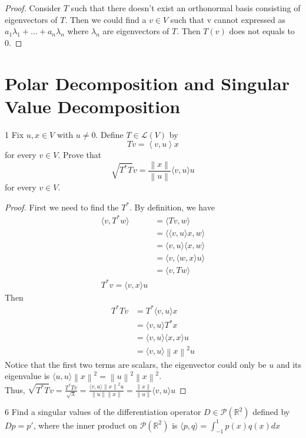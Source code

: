 \documentclass{article}
\newenvironment{problem}[1]{\begin{prob*}{#1}{}}{\end{prob*}}
\begin{document}
\begin{proof}
  Consider $T$ such that there doesn't exist an orthonormal basis consisting
  of eigenvectors of $T$. Then we could find a $v \in V$ such that v cannot expressed
  as $a_1 \lambda_1 + \dots + a_n \lambda_n$ where $\lambda_n$ are eigenvectors of $T$. Then $T(v)$ does not 
  equals to 0.
\end{proof}

\section{Polar Decomposition and Singular Value Decomposition}

\begin{problem}{1}
	Fix $u, x \in V$ with $u \neq 0$. Define $T \in \mathcal{L}(V)$ by \[
		Tv = \left< v, u \right> x
	\]
	for every $v \in V$. Prove that \[
		\sqrt{T^* T}v = \frac{\left\| x \right\|}{\left\| u \right\|} \langle v , u \rangle u
	\] for every $v \in V$.
\end{problem}
\begin{proof}
  First we need to find the $T^*$. By definition, we have
	\begin{equation*}
		\begin{aligned}
			\langle v , T^*w \rangle &= \langle Tv , w \rangle \\
			&= \langle \langle v , u \rangle x , w \rangle \\
			&= \langle v , u \rangle \langle x , w \rangle \\
			&= \langle v , \langle w , x \rangle u \rangle \\
			&= \langle v , Tw \rangle \\
			T^* v = \langle v , x \rangle u
		\end{aligned}
	\end{equation*}
	Then \begin{equation*}
		\begin{aligned}
		 T^*T v &= T^* \langle v , u \rangle x \\
		 &= \langle v , u \rangle T^* x \\
		 &= \langle v , u \rangle \langle x , x \rangle u \\
		 &= \langle v , u \rangle \left\| x \right\|^{2} u
		\end{aligned}
	\end{equation*}
	Notice that the first two terms are scalars,
	the eigenvector could only be $u$ and its eigenvalue
	is $\langle u , u \rangle \left\| x \right\|^{2} = \left\| u \right\|^{2} \left\| x \right\|^{2}$. \\
	Thus, $\sqrt{T^*T}v = \frac{T^*T v}{\sqrt{\lambda}} = \frac{\langle v , u \rangle\left\| x \right\|^{2} u}{\left\| u \right\|\left\| x \right\|}
	= \frac{\left\| x \right\|}{\left\| u \right\|}\langle v , u \rangle u $
\end{proof}

\begin{problem}{6}
  Find a singular values of the differentiation operator 
  $D \in \mathcal{P}(\mathbb{R}^2)$ defined by $Dp = p'$, where the inner product on
  $\mathcal{P}(\mathbb{R}^2)$ is $\langle p, q \rangle = \int_{-1}^{1} p(x)q(x) dx$
\end{problem}

\end{document}
